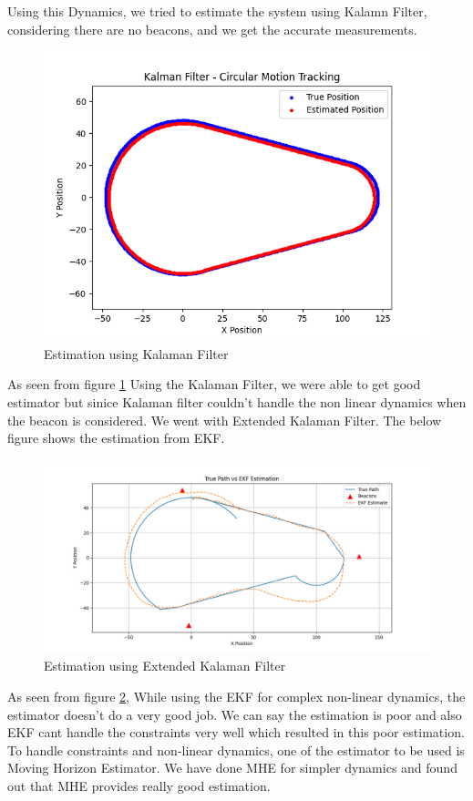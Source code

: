 \documentclass[a4paper,11pt]{article}
\begin{document}
Using this Dynamics, we tried to estimate the system using Kalamn Filter, considering there are no beacons, and we get the accurate measurements.
\begin{figure} [H]
    \centering
    \includegraphics[width=0.8\linewidth]{Figure_2.png}
    \caption{Estimation using Kalaman Filter}
    \label{fig:2}
\end{figure}

 As seen from figure \ref{fig:2} Using the Kalaman Filter, we were able to get good estimator but sinice Kalaman filter couldn't handle the non linear dynamics when the beacon is considered. We went with Extended Kalaman Filter. The below figure shows the estimation from EKF.

\begin{figure} [H]
    \centering
    \includegraphics[width=0.8\linewidth]{Figure_3.png}
    \caption{Estimation using Extended Kalaman Filter}
    \label{fig:3}
\end{figure}
As seen from figure \ref{fig:3}, While using the EKF for complex non-linear dynamics, the estimator doesn't do a very good job. We can say the estimation is poor and also EKF cant handle the constraints very well which resulted in this poor estimation.
To handle constraints and non-linear dynamics, one of the estimator to be used is Moving Horizon Estimator. We have done MHE for simpler dynamics and found out that MHE provides really good estimation.
\end{document}
